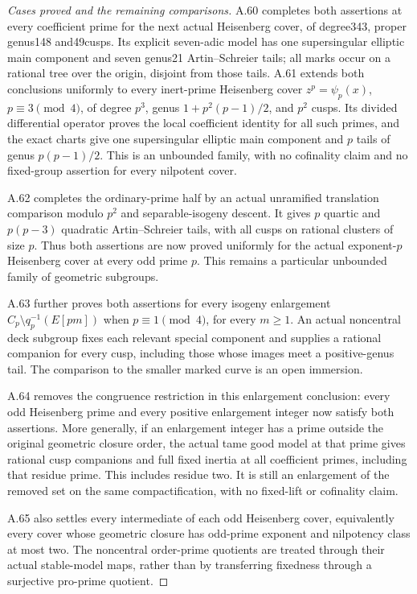 \begin{proof}[Cases proved and the remaining comparisons]
A.60 completes both assertions at every coefficient prime for
the next actual Heisenberg cover, of degree343, proper genus148
and49cusps. Its explicit seven-adic model has one supersingular
elliptic main component and seven genus21 Artin--Schreier tails;
all marks occur on a rational tree over the origin, disjoint
from those tails. A.61 extends both conclusions uniformly to
every inert-prime Heisenberg cover
\(z^p=\psi_p(x)\), \(p\equiv3\pmod4\), of degree
\(p^3\), genus \(1+p^2(p-1)/2\), and \(p^2\) cusps.
Its divided differential operator proves the local coefficient
identity for all such primes, and the exact charts give one
supersingular elliptic main component and \(p\) tails of genus
\(p(p-1)/2\). This is an unbounded family, with no cofinality
claim and no fixed-group assertion for every nilpotent cover.

A.62 completes the ordinary-prime half by an actual unramified
translation comparison modulo \(p^2\) and separable-isogeny descent.
It gives \(p\) quartic and \(p(p-3)\) quadratic Artin--Schreier
tails, with all cusps on rational clusters of size \(p\).
Thus both assertions are now proved uniformly for the actual
exponent-\(p\) Heisenberg cover at every odd prime \(p\).
This remains a particular unbounded family of geometric subgroups.

A.63 further proves both assertions for every isogeny enlargement
\(C_p\setminus q_p^{-1}(E[pm])\) when \(p\equiv1\pmod4\),
for every \(m\ge1\). An actual noncentral deck subgroup fixes
each relevant special component and supplies a rational companion
for every cusp, including those whose images meet a positive-genus
tail. The comparison to the smaller marked curve is an open immersion.

A.64 removes the congruence restriction in this enlargement conclusion:
every odd Heisenberg prime and every positive enlargement integer now
satisfy both assertions. More generally, if an enlargement integer has
a prime outside the original geometric closure order, the actual tame
good model at that prime gives rational cusp companions and full
fixed inertia at all coefficient primes, including that residue prime.
This includes residue two. It is still an enlargement of the removed
set on the same compactification, with no fixed-lift or cofinality claim.

A.65 also settles every intermediate of each odd Heisenberg cover,
equivalently every cover whose geometric closure has odd-prime exponent
and nilpotency class at most two. The noncentral order-prime quotients
are treated through their actual stable-model maps, rather than by
transferring fixedness through a surjective pro-prime quotient.


\end{proof}
